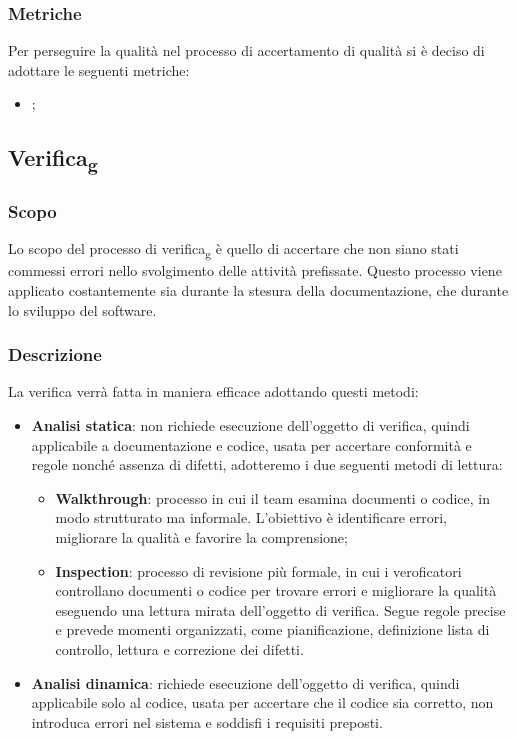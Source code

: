         \subsubsection{Metriche}
        Per perseguire la qualità nel processo di accertamento di qualità si è deciso di adottare le seguenti metriche:
        \begin{itemize}
                \item {};
        \end{itemize}
    \subsection{Verifica\textsubscript{g}}
        \subsubsection{Scopo}
        Lo scopo del processo di verifica\textsubscript{g} è quello di accertare che non siano stati commessi errori nello svolgimento
        delle attività prefissate. Questo processo viene applicato costantemente sia durante la stesura
        della documentazione, che durante lo sviluppo del software.
        \subsubsection{Descrizione}
        La verifica verrà fatta in maniera efficace adottando questi metodi:
        \begin{itemize}
            \item \textbf{Analisi statica}: non richiede esecuzione dell'oggetto di verifica, quindi applicabile a documentazione e codice, usata per accertare conformità e regole nonché assenza di difetti, adotteremo i due seguenti metodi di lettura:
             \begin{itemize}
                \item \textbf{Walkthrough}: processo in cui il team esamina documenti o codice, in modo strutturato ma informale. L'obiettivo è identificare errori, migliorare la qualità e favorire la comprensione;
                \item \textbf{Inspection}: processo di revisione più formale, in cui i veroficatori controllano documenti o codice per trovare errori e migliorare la qualità eseguendo una lettura mirata dell'oggetto di verifica. Segue regole precise e prevede momenti organizzati, come pianificazione, definizione lista di controllo, lettura e correzione dei difetti.
             \end{itemize}
             \item \textbf{Analisi dinamica}: richiede esecuzione dell'oggetto di verifica, quindi applicabile solo al codice, usata per accertare che il codice sia corretto, non introduca errori nel sistema e soddisfi i requisiti preposti.
        \end{itemize}
